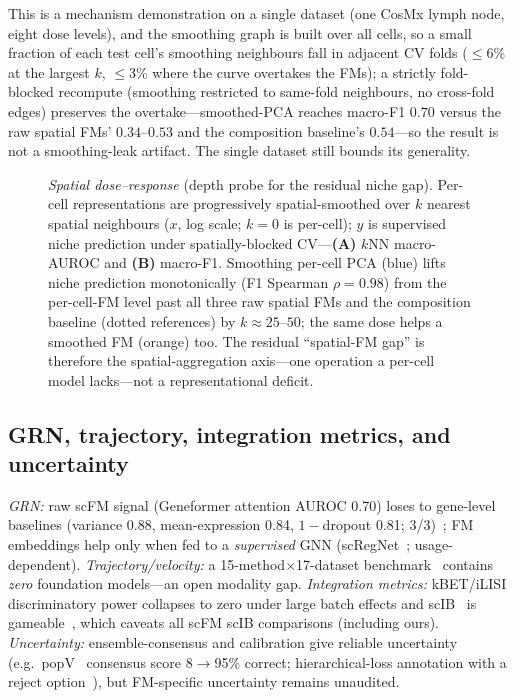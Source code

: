 \documentclass[fleqn,10pt,lineno]{wlpeerj}  %
\newcommand{\fitfig}[1]{\resizebox{\ifdim\width>\linewidth\linewidth\else\width\fi}{!}{#1}}
\begin{document}
This is a mechanism demonstration on a single dataset (one CosMx lymph node, eight dose levels), and the smoothing graph is built over all cells, so a small fraction of each test cell's smoothing neighbours fall in adjacent CV folds ($\le 6\%$ at the largest $k$, $\le 3\%$ where the curve overtakes the FMs); a strictly fold-blocked recompute (smoothing restricted to same-fold neighbours, no cross-fold edges) preserves the overtake---smoothed-PCA reaches macro-F1 $0.70$ versus the raw spatial FMs' $0.34$--$0.53$ and the composition baseline's $0.54$---so the result is not a smoothing-leak artifact. The single dataset still bounds its generality.

\begin{figure}[htb]\centering\fitfig{}
\caption{\emph{Spatial dose--response} (depth probe for the residual niche gap). Per-cell representations are progressively spatial-smoothed over $k$ nearest spatial neighbours ($x$, log scale; $k{=}0$ is per-cell); $y$ is supervised niche prediction under spatially-blocked CV---\textbf{(A)} $k$NN macro-AUROC and \textbf{(B)} macro-F1. Smoothing per-cell PCA (blue) lifts niche prediction monotonically (F1 Spearman $\rho=0.98$) from the per-cell-FM level past all three raw spatial FMs and the composition baseline (dotted references) by $k\approx25$--$50$; the same dose helps a smoothed FM (orange) too. The residual ``spatial-FM gap'' is therefore the spatial-aggregation axis---one operation a per-cell model lacks---not a representational deficit.}\label{fig:spatialdose}\end{figure}

\subsection{GRN, trajectory, integration metrics, and uncertainty}
\emph{GRN:} raw scFM signal (Geneformer attention AUROC 0.70) loses to gene-level baselines (variance 0.88, mean-expression 0.84, $1-$dropout 0.81; 3/3)~\cite{kendiukhov2026}; FM embeddings help only when fed to a \emph{supervised} GNN (scRegNet~\cite{scregnet2025}; usage-dependent). \emph{Trajectory/velocity:} a 15-method$\times$17-dataset benchmark~\cite{velobench2026} contains \emph{zero} foundation models---an open modality gap. \emph{Integration metrics:} kBET/iLISI discriminatory power collapses to zero under large batch effects and scIB~\cite{luecken2022} is gameable~\cite{rbet2025,scibe2025}, which caveats all scFM scIB comparisons (including ours). \emph{Uncertainty:} ensemble-consensus and calibration give reliable uncertainty (e.g.\ popV~\cite{popv2024} consensus score 8$\to$95\% correct; hierarchical-loss annotation with a reject option~\cite{hce2026,theunissen2024}), but FM-specific uncertainty remains unaudited.
\end{document}
